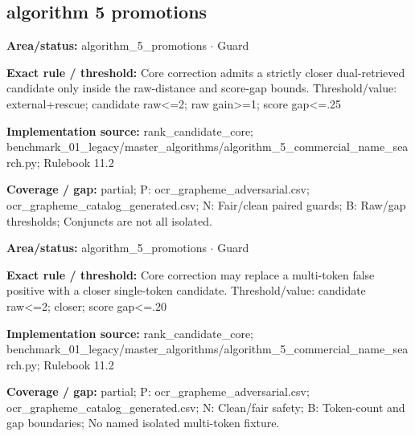 \subsection*{algorithm 5 promotions}
\begin{tcolorbox}[enhanced,breakable,colback=white,colframe=Muted!45,boxrule=0.45pt,arc=1.5pt,left=6pt,right=6pt,top=5pt,bottom=5pt,title={\texttt{A5-CORE-DUAL-CLOSER-17A}},title after break={\texttt{A5-CORE-DUAL-CLOSER-17A}\ (continued)},fonttitle=\headingfont\bfseries\color{Navy},coltitle=Navy]
\textbf{Area/status:} algorithm\_\allowbreak{}5\_\allowbreak{}promotions $\boldsymbol{\cdot}$ Guard\par
\smallskip
\textbf{Exact rule / threshold:} Core correction admits a strictly closer dual-retrieved candidate only inside the raw-distance and score-gap bounds. Threshold/\allowbreak{}value: external+rescue; candidate raw<=2; raw gain>=1; score gap<=.25\par
\smallskip
\textbf{Implementation source:} rank\_\allowbreak{}candidate\_\allowbreak{}core; benchmark\_\allowbreak{}01\_\allowbreak{}legacy/\allowbreak{}master\_\allowbreak{}algorithms/\allowbreak{}algorithm\_\allowbreak{}5\_\allowbreak{}commercial\_\allowbreak{}name\_\allowbreak{}search.py; Rulebook 11.2\par
\smallskip
\textbf{Coverage / gap:} partial; P: ocr\_\allowbreak{}grapheme\_\allowbreak{}adversarial.csv; ocr\_\allowbreak{}grapheme\_\allowbreak{}catalog\_\allowbreak{}generated.csv; N: Fair/\allowbreak{}clean paired guards; B: Raw/\allowbreak{}gap thresholds; Conjuncts are not all isolated.
\end{tcolorbox}
\begin{tcolorbox}[enhanced,breakable,colback=white,colframe=Muted!45,boxrule=0.45pt,arc=1.5pt,left=6pt,right=6pt,top=5pt,bottom=5pt,title={\texttt{A5-CORE-MULTITOKEN-17C}},title after break={\texttt{A5-CORE-MULTITOKEN-17C}\ (continued)},fonttitle=\headingfont\bfseries\color{Navy},coltitle=Navy]
\textbf{Area/status:} algorithm\_\allowbreak{}5\_\allowbreak{}promotions $\boldsymbol{\cdot}$ Guard\par
\smallskip
\textbf{Exact rule / threshold:} Core correction may replace a multi-token false positive with a closer single-token candidate. Threshold/\allowbreak{}value: candidate raw<=2; closer; score gap<=.20\par
\smallskip
\textbf{Implementation source:} rank\_\allowbreak{}candidate\_\allowbreak{}core; benchmark\_\allowbreak{}01\_\allowbreak{}legacy/\allowbreak{}master\_\allowbreak{}algorithms/\allowbreak{}algorithm\_\allowbreak{}5\_\allowbreak{}commercial\_\allowbreak{}name\_\allowbreak{}search.py; Rulebook 11.2\par
\smallskip
\textbf{Coverage / gap:} partial; P: ocr\_\allowbreak{}grapheme\_\allowbreak{}adversarial.csv; ocr\_\allowbreak{}grapheme\_\allowbreak{}catalog\_\allowbreak{}generated.csv; N: Clean/\allowbreak{}fair safety; B: Token-count and gap boundaries; No named isolated multi-token fixture.
\end{tcolorbox}
